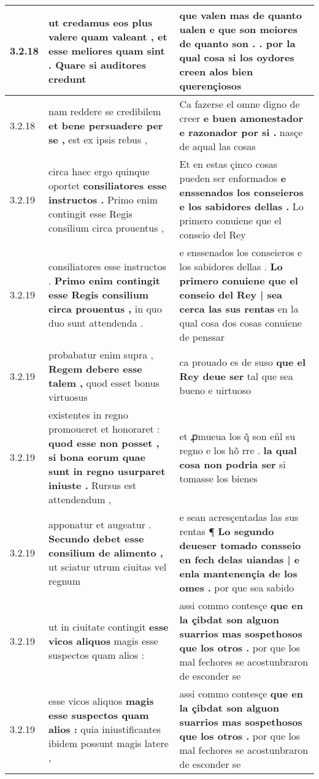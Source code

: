\begin{tabular}{|p{1cm}|p{6.5cm}|p{6.5cm}|}
3.2.18 & ut credamus eos plus valere quam valeant , \textbf{ et esse meliores quam sint . } Quare si auditores credunt & que valen mas de quanto ualen \textbf{ e que son meiores de quanto son . . } por la qual cosa si los oydores creen alos bien querençiosos \\\hline
3.2.18 & nam reddere se credibilem \textbf{ et bene persuadere per se , } est ex ipsis rebus , & Ca fazerse el omne digno de creer \textbf{ e buen amonestador e razonador por si . } nasçe de aqual las cosas \\\hline
3.2.19 & circa haec ergo quinque oportet \textbf{ consiliatores esse instructos . } Primo enim contingit esse Regis consilium circa prouentus , & Et en estas çinco cosas pueden ser enformados \textbf{ e enssenados los conseieros e los sabidores dellas . } Lo primero conuiene que el conseio del Rey \\\hline
3.2.19 & consiliatores esse instructos . \textbf{ Primo enim contingit esse Regis consilium circa prouentus , } in quo duo sunt attendenda . & e enssenados los conseieros e los sabidores dellas . \textbf{ Lo primero conuiene que el conseio del Rey | sea cerca las sus rentas } en la qual cosa dos cosas conuiene de penssar \\\hline
3.2.19 & probabatur enim supra , \textbf{ Regem debere esse talem , } quod esset bonus virtuosus & ca prouado es de suso \textbf{ que el Rey deue ser } tal que sea bueno e uirtuoso \\\hline
3.2.19 & existentes in regno promoueret et honoraret : \textbf{ quod esse non posset , si bona eorum quae sunt in regno usurparet iniuste . } Rursus est attendendum , & et ꝓmueua los q̃ son eñl su regno e los hõ rre . \textbf{ la qual cosa non podria ser } si tomasse los bienes \\\hline
3.2.19 & apponatur et augeatur . \textbf{ Secundo debet esse consilium de alimento , } ut sciatur utrum ciuitas vel regnum & e sean acresçentadas las sus rentas ¶ \textbf{ Lo segundo deueser tomado consseio en fech delas uiandas | e enla mantenençia de los omes . } por que sea sabido \\\hline
3.2.19 & ut in ciuitate contingit \textbf{ esse vicos aliquos } magis esse suspectos quam alios : & assi commo contesçe \textbf{ que en la çibdat son alguon suarrios mas sospethosos que los otros . } por que los mal fechores se acostunbraron de esconder se \\\hline
3.2.19 & esse vicos aliquos \textbf{ magis esse suspectos quam alios : } quia iniustificantes ibidem possunt magis latere , & assi commo contesçe \textbf{ que en la çibdat son alguon suarrios mas sospethosos que los otros . } por que los mal fechores se acostunbraron de esconder se \\\hline

\end{tabular}
